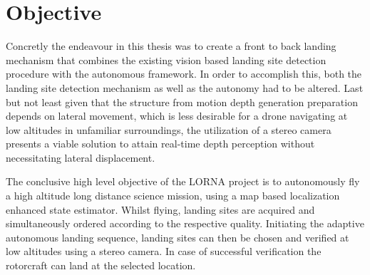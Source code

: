 \section{Objective}

Concretly the endeavour in this thesis was to create a front to back landing mechanism that combines the existing vision based landing site detection procedure with the autonomous framework. In order to accomplish this, both the landing site detection mechanism as well as the autonomy had to be altered. Last but not least given that the structure from motion depth generation preparation depends on lateral movement, which is less desirable for a drone navigating at low altitudes in unfamiliar surroundings, the utilization of a stereo camera presents a viable solution to attain real-time depth perception without necessitating lateral displacement.

The conclusive high level objective of the LORNA project is to autonomously fly a high altitude long distance science mission, using a map based localization enhanced state estimator. Whilst flying, landing sites are acquired and simultaneously ordered according to the respective quality. Initiating the adaptive autonomous landing sequence, landing sites can then be chosen and verified at low altitudes using a stereo camera. In case of successful verification the rotorcraft can land at the selected location. 